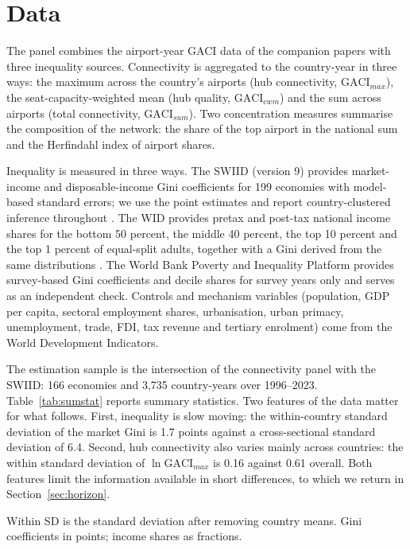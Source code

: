 \documentclass[12pt]{article}
\begin{document}
\section{Data}
\label{sec:data}
The panel combines the airport-year GACI data of the companion papers with three inequality sources. Connectivity is aggregated to the country-year in three ways: the maximum across the country's airports (hub connectivity, $\mathrm{GACI}_{max}$), the seat-capacity-weighted mean (hub quality, $\mathrm{GACI}_{cwm}$) and the sum across airports (total connectivity, $\mathrm{GACI}_{sum}$). Two concentration measures summarise the composition of the network: the share of the top airport in the national sum and the Herfindahl index of airport shares.

Inequality is measured in three ways. The SWIID (version 9) provides market-income and disposable-income Gini coefficients for 199 economies with model-based standard errors; we use the point estimates and report country-clustered inference throughout \citep{Solt_2020}. The WID provides pretax and post-tax national income shares for the bottom 50 percent, the middle 40 percent, the top 10 percent and the top 1 percent of equal-split adults, together with a Gini derived from the same distributions \citep{WID_2024}. The World Bank Poverty and Inequality Platform provides survey-based Gini coefficients and decile shares for survey years only and serves as an independent check. Controls and mechanism variables (population, GDP per capita, sectoral employment shares, urbanisation, urban primacy, unemployment, trade, FDI, tax revenue and tertiary enrolment) come from the World Development Indicators.

The estimation sample is the intersection of the connectivity panel with the SWIID: 166 economies and 3,735 country-years over 1996--2023. Table~\ref{tab:sumstat} reports summary statistics. Two features of the data matter for what follows. First, inequality is slow moving: the within-country standard deviation of the market Gini is 1.7 points against a cross-sectional standard deviation of 6.4. Second, hub connectivity also varies mainly across countries: the within standard deviation of $\ln\mathrm{GACI}_{max}$ is 0.16 against 0.61 overall. Both features limit the information available in short differences, to which we return in Section~\ref{sec:horizon}.

\begin{table}[H]\centering\caption{Summary statistics, estimation sample (166 economies, 1996--2023).}\label{tab:sumstat}
\begin{threeparttable}\small
\begin{tablenotes}\footnotesize\item Within SD is the standard deviation after removing country means. Gini coefficients in points; income shares as fractions.\end{tablenotes}\end{threeparttable}\end{table}
\end{document}
